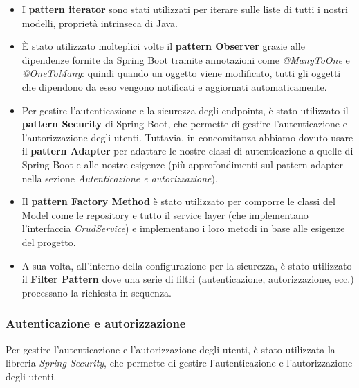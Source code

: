 \documentclass[a4paper]{article}
\begin{document}
\begin{itemize}
  \item I \textbf{pattern iterator} sono stati utilizzati per iterare sulle liste di tutti i nostri modelli, proprietà intrinseca
  di Java. 
  \item È stato utilizzato molteplici volte il \textbf{pattern Observer} grazie alle dipendenze fornite da Spring Boot 
  tramite annotazioni come \textit{@ManyToOne} e \textit{@OneToMany}: quindi quando un oggetto viene modificato,
  tutti gli oggetti che dipendono da esso vengono notificati e aggiornati automaticamente.
  \item Per gestire l'autenticazione e la sicurezza degli endpoints, è stato utilizzato il \textbf{pattern Security} di Spring Boot,
  che permette di gestire l'autenticazione e l'autorizzazione degli utenti. Tuttavia, in concomitanza abbiamo dovuto usare 
  il \textbf{pattern Adapter} per adattare le nostre classi di autenticazione a quelle di Spring Boot e alle nostre esigenze
  (più approfondimenti sul pattern adapter nella sezione \textit{Autenticazione e autorizzazione}).
  \item Il \textbf{pattern Factory Method} è stato utilizzato per comporre le classi del Model come le repository
  e tutto il service layer (che implementano l'interfaccia \textit{CrudService}) e implementano i loro metodi in base 
  alle esigenze del progetto.
  \item A sua volta, all'interno della configurazione per la sicurezza, è stato utilizzato il \textbf{Filter Pattern}
  dove una serie di filtri (autenticazione, autorizzazione, ecc.) processano la richiesta in sequenza.
\end{itemize}

\subsubsection{Autenticazione e autorizzazione}

Per gestire l'autenticazione e l'autorizzazione degli utenti, è stato utilizzata la libreria \textit{Spring Security}, che permette di gestire
l'autenticazione e l'autorizzazione degli utenti. 
\end{document}
